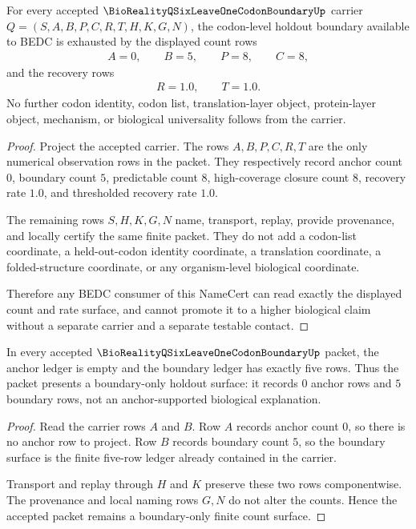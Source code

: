 \begin{theorem}\label{thm:bioreality-q-six-leave-one-codon-boundary-count-surface}
For every accepted $\BioRealityQSixLeaveOneCodonBoundaryUp$ carrier $Q=(S,A,B,P,C,R,T,H,K,G,N)$, the codon-level holdout boundary available to BEDC is exhausted by the displayed count rows
$$
\begin{gathered}
A=0,\qquad B=5,\qquad P=8,\qquad C=8,
\end{gathered}
$$
and the recovery rows
$$
\begin{gathered}
R=1.0,\qquad T=1.0 .
\end{gathered}
$$
No further codon identity, codon list, translation-layer object, protein-layer object, mechanism, or biological universality follows from the carrier.
\end{theorem}
\begin{proof}
Project the accepted carrier. The rows $A,B,P,C,R,T$ are the only numerical observation rows in the packet. They respectively record anchor count $0$, boundary count $5$, predictable count $8$, high-coverage closure count $8$, recovery rate $1.0$, and thresholded recovery rate $1.0$.

The remaining rows $S,H,K,G,N$ name, transport, replay, provide provenance, and locally certify the same finite packet. They do not add a codon-list coordinate, a held-out-codon identity coordinate, a translation coordinate, a folded-structure coordinate, or any organism-level biological coordinate.

Therefore any BEDC consumer of this NameCert can read exactly the displayed count and rate surface, and cannot promote it to a higher biological claim without a separate carrier and a separate testable contact.
\end{proof}

\begin{theorem}\label{thm:bioreality-q-six-leave-one-codon-boundary-anchor-budget}
In every accepted $\BioRealityQSixLeaveOneCodonBoundaryUp$ packet, the anchor ledger is empty and the boundary ledger has exactly five rows. Thus the packet presents a boundary-only holdout surface: it records $0$ anchor rows and $5$ boundary rows, not an anchor-supported biological explanation.
\end{theorem}
\begin{proof}
Read the carrier rows $A$ and $B$. Row $A$ records anchor count $0$, so there is no anchor row to project. Row $B$ records boundary count $5$, so the boundary surface is the finite five-row ledger already contained in the carrier.

Transport and replay through $H$ and $K$ preserve these two rows componentwise. The provenance and local naming rows $G,N$ do not alter the counts. Hence the accepted packet remains a boundary-only finite count surface.
\end{proof}


